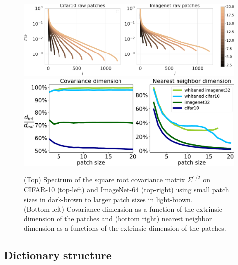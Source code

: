 \documentclass{article}
\begin{document}
\begin{figure}[h]
    \centering
    \includegraphics[width=.9\linewidth]{figures/spectrum_patches}
	\includegraphics[width=.9\linewidth]{figures/intrinsic_dims}
	\caption{(Top) Spectrum  of the square root covariance matrix $\Sigma^{1/2}$ on CIFAR-10 (top-left) and ImageNet-64 (top-right) using small patch sizes in dark-brown to larger patch sizes in light-brown.\\
	(Bottom-left) Covariance dimension as a function of the extrinsic dimension of the patches and (bottom right) nearest neighbor dimension as a functions of the extrinsic dimension of the patches.}
	\label{fig:spec_intrinsic_dim}
\end{figure}

\vspace{-.1cm}
\subsection{Dictionary structure}
\label{structure}
\vspace{-.1cm}
\end{document}
